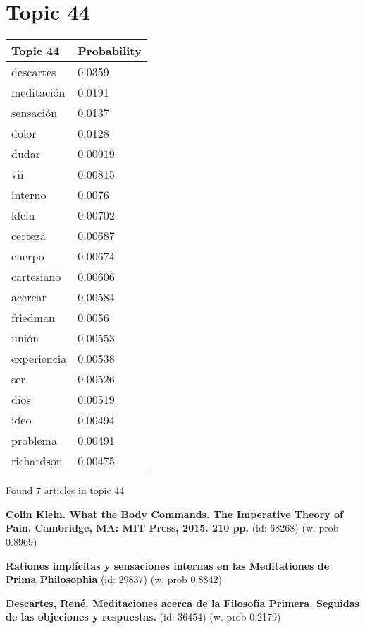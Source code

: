 \documentclass{article}
\begin{document}
\vfill
\newpage


\centering
\thispagestyle{empty}
\section*{Topic 44}\vfill
\begin{tabular}{ll}
\toprule
    Topic 44 & Probability \\
\midrule
   descartes &      0.0359 \\
  meditación &      0.0191 \\
   sensación &      0.0137 \\
       dolor &      0.0128 \\
       dudar &     0.00919 \\
         vii &     0.00815 \\
     interno &      0.0076 \\
       klein &     0.00702 \\
     certeza &     0.00687 \\
      cuerpo &     0.00674 \\
  cartesiano &     0.00606 \\
     acercar &     0.00584 \\
    friedman &      0.0056 \\
       unión &     0.00553 \\
 experiencia &     0.00538 \\
         ser &     0.00526 \\
        dios &     0.00519 \\
        ideo &     0.00494 \\
    problema &     0.00491 \\
  richardson &     0.00475 \\
\bottomrule
\end{tabular}

\vfill
Found 7 articles in topic 44
\vfill

\textbf{Colin Klein. What the Body Commands.  The Imperative Theory of Pain. Cambridge,  MA: MIT Press, 2015. 210 pp.} (id: 68268)
 (w. prob 0.8969)
\vfill

\textbf{Rationes implícitas y sensaciones internas en las Meditationes de Prima Philosophia} (id: 29837)
 (w. prob 0.8842)
\vfill

\textbf{Descartes, René. Meditaciones acerca de la Filosofía Primera. Seguidas de las objeciones y respuestas.} (id: 36454)
 (w. prob 0.2179)

\vfill
\newpage
\end{document}

